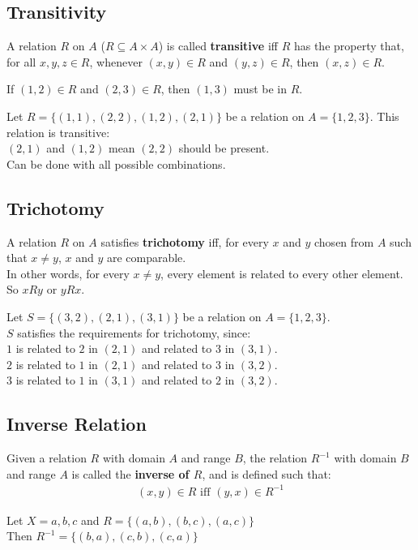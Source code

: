 \documentclass[../notes.tex]{subfiles}
\begin{document}
			\subsection{Transitivity}
				A relation $R$ on $A$ ($R \subseteq A \times A$) is called \textbf{transitive} iff $R$ has the property that, for all $x, y, z \in R$, whenever $(x, y) \in R$ and $(y, z) \in R$, then $(x, z) \in R$.
				\begin{example}
					If $(1, 2) \in R$ and $(2, 3) \in R$, then $(1, 3)$ must be in $R$.
				\end{example}
				\begin{example}
					Let $R = \bigl\{(1, 1), (2, 2), (1, 2), (2, 1)\bigr\}$ be a relation on $A = \{1, 2, 3\}$. This relation is transitive:\\
					$(2, 1)$ and $(1, 2)$ mean $(2, 2)$ should be present.\\
					Can be done with all possible combinations.
				\end{example}
			\subsection{Trichotomy}
				A relation $R$ on $A$ satisfies \textbf{trichotomy} iff, for every $x$ and $y$ chosen from $A$ such that $x \neq y$, $x$ and $y$ are comparable.\\
				In other words, for every $x \neq y$, every element is related to every other element. So $x R y$ or $y R x$.
				\begin{example}
					Let $S = \bigl\{(3, 2), (2, 1), (3, 1)\bigr\}$ be a relation on $A = \{1, 2, 3\}$.\\
					$S$ satisfies the requirements for trichotomy, since:\\
					\-\hspace{1cm} $1$ is related to $2$ in $(2, 1)$ and related to $3$ in $(3, 1)$.\\
					\-\hspace{1cm} $2$ is related to $1$ in $(2, 1)$ and related to $3$ in $(3, 2)$.\\
					\-\hspace{1cm} $3$ is related to $1$ in $(3, 1)$ and related to $2$ in $(3, 2)$.
				\end{example}
			\subsection{Inverse Relation}
				Given a relation $R$ with domain $A$ and range $B$, the relation $R^{-1}$ with domain $B$ and range $A$ is called the \textbf{inverse of $R$}, and is defined such that:
				\begin{align*}
					(x, y) \in R \text{ iff } (y, x) \in R^{-1}
				\end{align*}
				\begin{example}
					Let $X = {a, b, c}$ and $R = \bigl\{(a, b), (b, c), (a, c)\bigr\}$\\
					Then $R^{-1} = \bigl\{(b, a), (c, b), (c, a)\bigr\}$
				\end{example}
\end{document}
